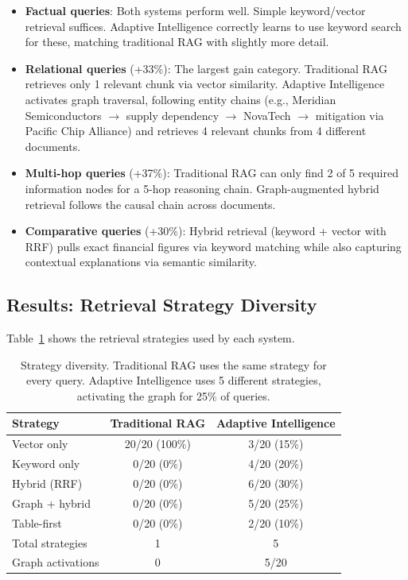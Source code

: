 \documentclass[11pt]{article}
\begin{document}
\begin{itemize}
    \item \textbf{Factual queries}: Both systems perform well. Simple keyword/vector retrieval suffices. Adaptive Intelligence correctly learns to use keyword search for these, matching traditional RAG with slightly more detail.
    
    \item \textbf{Relational queries} (+33\%): The largest gain category. Traditional RAG retrieves only 1 relevant chunk via vector similarity. Adaptive Intelligence activates graph traversal, following entity chains (e.g., Meridian Semiconductors $\rightarrow$ supply dependency $\rightarrow$ NovaTech $\rightarrow$ mitigation via Pacific Chip Alliance) and retrieves 4 relevant chunks from 4 different documents.
    
    \item \textbf{Multi-hop queries} (+37\%): Traditional RAG can only find 2 of 5 required information nodes for a 5-hop reasoning chain. Graph-augmented hybrid retrieval follows the causal chain across documents.
    
    \item \textbf{Comparative queries} (+30\%): Hybrid retrieval (keyword + vector with RRF) pulls exact financial figures via keyword matching while also capturing contextual explanations via semantic similarity.
\end{itemize}

\subsection{Results: Retrieval Strategy Diversity}

Table~\ref{tab:strategies} shows the retrieval strategies used by each system.

\begin{table}[H]
    \centering
    \begin{tabular}{@{}lcc@{}}
        \toprule
        \textbf{Strategy} & \textbf{Traditional RAG} & \textbf{Adaptive Intelligence} \\
        \midrule
        Vector only       & 20/20 (100\%) & 3/20 (15\%) \\
        Keyword only      & 0/20 (0\%)    & 4/20 (20\%) \\
        Hybrid (RRF)      & 0/20 (0\%)    & 6/20 (30\%) \\
        Graph + hybrid    & 0/20 (0\%)    & 5/20 (25\%) \\
        Table-first       & 0/20 (0\%)    & 2/20 (10\%) \\
        \midrule
        Total strategies   & 1              & 5 \\
        Graph activations  & 0              & 5/20 \\
        \bottomrule
    \end{tabular}
    \caption{Strategy diversity. Traditional RAG uses the same strategy for every query. Adaptive Intelligence uses 5 different strategies, activating the graph for 25\% of queries.}
    \label{tab:strategies}
\end{table}
\end{document}
